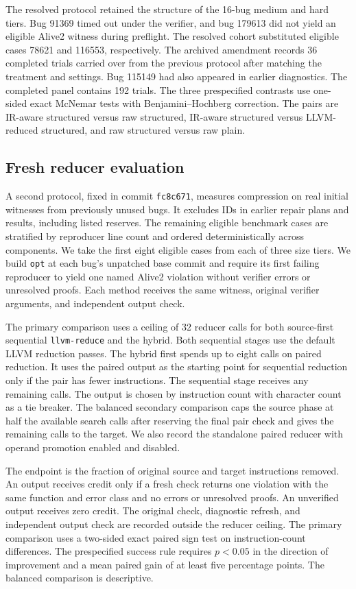 \documentclass[conference]{IEEEtran}
\begin{document}
The resolved protocol retained the structure of the 16-bug medium and hard tiers. Bug 91369 timed out under the verifier, and bug 179613 did not yield an eligible Alive2 witness during preflight. The resolved cohort substituted eligible cases 78621 and 116553, respectively. The archived amendment records 36 completed trials carried over from the previous protocol after matching the treatment and settings. Bug 115149 had also appeared in earlier diagnostics. The completed panel contains 192 trials. The three prespecified contrasts use one-sided exact McNemar tests with Benjamini--Hochberg correction. The pairs are IR-aware structured versus raw structured, IR-aware structured versus LLVM-reduced structured, and raw structured versus raw plain.

\subsection{Fresh reducer evaluation}
\label{sec:fresh-design}

A second protocol, fixed in commit \texttt{fc8c671}, measures compression on real initial witnesses from previously unused bugs. It excludes IDs in earlier repair plans and results, including listed reserves. The remaining eligible benchmark cases are stratified by reproducer line count and ordered deterministically across components. We take the first eight eligible cases from each of three size tiers. We build \texttt{opt} at each bug's unpatched base commit and require its first failing reproducer to yield one named Alive2 violation without verifier errors or unresolved proofs. Each method receives the same witness, original verifier arguments, and independent output check.

The primary comparison uses a ceiling of 32 reducer calls for both source-first sequential \texttt{llvm-reduce} and the hybrid. Both sequential stages use the default LLVM reduction passes. The hybrid first spends up to eight calls on paired reduction. It uses the paired output as the starting point for sequential reduction only if the pair has fewer instructions. The sequential stage receives any remaining calls. The output is chosen by instruction count with character count as a tie breaker. The balanced secondary comparison caps the source phase at half the available search calls after reserving the final pair check and gives the remaining calls to the target. We also record the standalone paired reducer with operand promotion enabled and disabled.

The endpoint is the fraction of original source and target instructions removed. An output receives credit only if a fresh check returns one violation with the same function and error class and no errors or unresolved proofs. An unverified output receives zero credit. The original check, diagnostic refresh, and independent output check are recorded outside the reducer ceiling. The primary comparison uses a two-sided exact paired sign test on instruction-count differences. The prespecified success rule requires $p<0.05$ in the direction of improvement and a mean paired gain of at least five percentage points. The balanced comparison is descriptive.
\end{document}
